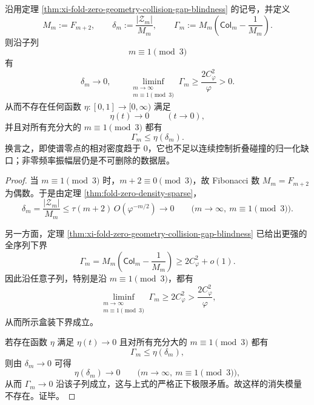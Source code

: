 \begin{theorem}[零点计数对碰撞缺口不存在消失模量]\label{cor:xi-fold-zero-density-no-bounded-control-on-normalized-collision}
沿用定理 \ref{thm:xi-fold-zero-geometry-collision-gap-blindness} 的记号，并定义
\[
M_m:=F_{m+2},
\qquad
\delta_m:=\frac{|\mathcal Z_m|}{M_m},
\qquad
\Gamma_m:=M_m\!\left(\mathsf{Col}_m-\frac{1}{M_m}\right).
\]
则沿子列
\[
m\equiv 1\pmod 3
\]
有
\[
\boxed{\;
\delta_m\longrightarrow 0,
\qquad
\liminf_{\substack{m\to\infty\\ m\equiv 1\!\!\!\!\pmod 3}}
\Gamma_m
\ge
\frac{2C_\varphi^2}{\varphi}>0.\;}
\]
从而不存在任何函数 \(\eta:[0,1]\to[0,\infty)\) 满足
\[
\eta(t)\longrightarrow 0
\qquad (t\to 0),
\]
并且对所有充分大的 \(m\equiv 1\pmod 3\) 都有
\[
\Gamma_m\le \eta(\delta_m).
\]
换言之，即使谱零点的相对密度趋于 \(0\)，它也不足以连续控制折叠碰撞的归一化缺口；非零频率振幅层仍是不可删除的数据层。
\end{theorem}
\begin{proof}
当 \(m\equiv 1\pmod 3\) 时，\(m+2\equiv 0\pmod 3\)，故 Fibonacci 数 \(M_m=F_{m+2}\) 为偶数。于是由定理 \ref{thm:fold-zero-density-sparse}，
\[
\delta_m=\frac{|\mathcal Z_m|}{M_m}
\le
\tau(m+2)\,O(\varphi^{-m/2})
\longrightarrow 0
\qquad
\bigl(m\to\infty,\ m\equiv 1\!\!\!\!\pmod 3\bigr).
\]

另一方面，定理 \ref{thm:xi-fold-zero-geometry-collision-gap-blindness} 已给出更强的全序列下界
\[
\Gamma_m
=
M_m\!\left(\mathsf{Col}_m-\frac1{M_m}\right)
\ge
2C_\varphi^2+o(1).
\]
因此沿任意子列，特别是沿 \(m\equiv 1\pmod 3\)，都有
\[
\liminf_{\substack{m\to\infty\\ m\equiv 1\!\!\!\!\pmod 3}}\Gamma_m
\ge
2C_\varphi^2
>
\frac{2C_\varphi^2}{\varphi},
\]
从而所示盒装下界成立。

若存在函数 \(\eta\) 满足 \(\eta(t)\to 0\) 且对所有充分大的 \(m\equiv 1\pmod 3\) 都有
\[
\Gamma_m\le \eta(\delta_m),
\]
则由 \(\delta_m\to 0\) 可得
\[
\eta(\delta_m)\longrightarrow 0
\qquad
\bigl(m\to\infty,\ m\equiv 1\!\!\!\!\pmod 3\bigr),
\]
从而 \(\Gamma_m\to 0\) 沿该子列成立，这与上式的严格正下极限矛盾。故这样的消失模量不存在。证毕。
\end{proof}

\endinput
